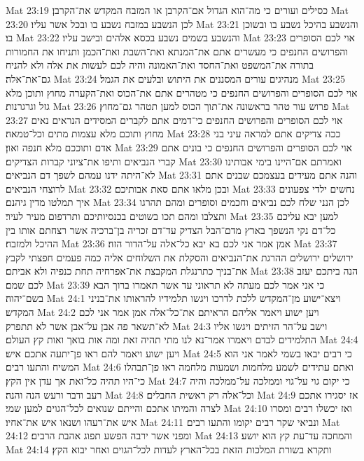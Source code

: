Mat 23:19  כסילים ועורים כי מה־הוא הגדול אם־הקרבן או המזבח המקדש את־הקרבן׃
Mat 23:20  לכן הנשבע במזבח נשבע בו ובכל אשר עליו׃
Mat 23:21  והנשבע בהיכל נשבע בו ובשוכן בו׃
Mat 23:22  והנשבע בשמים נשבע בכסא אלהים ובישב עליו׃
Mat 23:23  אוי לכם הסופרים והפרושים החנפים כי מעשרים אתם את־המנתא ואת־השבת ואת־הכמן ותניחו את החמורות בתורה את־המשפט ואת־החסד ואת־האמונה והיה לכם לעשות את אלה ולא להניח גם־את־אלה׃
Mat 23:24  מנהיגים עורים המסננים את היתוש ובלעים את הגמל׃
Mat 23:25  אוי לכם הסופרים והפרושים החנפים כי מטהרים אתם את־הכוס ואת־הקערה מחוץ ותוכן מלא גזל וגרגרנות׃
Mat 23:26  פרוש עור טהר בראשונה את־תוך הכוס למען תטהר גם־מחוץ׃
Mat 23:27  אוי לכם הסופרים והפרושים החנפים כי־דמים אתם לקברים המסידים הנראים נאים מחוץ ותוכם מלא עצמות מתים וכל־טמאה׃
Mat 23:28  ככה צדיקים אתם למראה עיני בני אדם ותוככם מלא חנפה ואון׃
Mat 23:29  אוי לכם הסופרים והפרושים החנפים כי בונים אתם קברי הנביאים ותיפו את־ציוני קברות הצדיקים׃
Mat 23:30  ואמרתם אם־היינו בימי אבותינו לא־היתה ידנו עמהם לשפך דם הנביאים׃
Mat 23:31  והנה אתם מעידים בעצמכם שבנים אתם לרוצחי הנביאים׃
Mat 23:32  ובכן מלאו אתם סאת אבותיכם׃
Mat 23:33  נחשים ילדי צפעונים איך תמלטו מדין גיהנם׃
Mat 23:34  לכן הנני שלח לכם נביאים וחכמים וסופרים ומהם תהרגו ותצלבו ומהם תכו בשוטים בכנסיותיכם ותרדפום מעיר לעיר׃
Mat 23:35  למען יבא עליכם כל־דם נקי הנשפך בארץ מדם־הבל הצדיק עד־דם זכריה בן־ברכיה אשר רצחתם אותו בין ההיכל ולמזבח׃
Mat 23:36  אמן אמר אני לכם בא יבא כל־אלה על־הדור הזה׃
Mat 23:37  ירושלים ירושלים ההרגת את־הנביאים והסקלת את השלוחים אליה כמה פעמים חפצתי לקבץ את־בניך כתרנגלת המקבצת את־אפרחיה תחת כנפיה ולא אביתם׃
Mat 23:38  הנה ביתכם יעזב לכם שמם׃
Mat 23:39  כי אני אמר לכם מעתה לא תראוני עד אשר תאמרו ברוך הבא בשם־יהוה׃
Mat 24:1  ויצא־ישוע מן־המקדש ללכת לדרכו ויגשו תלמידיו להראותו את־בניני המקדש׃
Mat 24:2  ויען ישוע ויאמר אליהם הראיתם את־כל־אלה אמן אמר אני לכם לא־תשאר פה אבן על־אבן אשר לא תתפרק׃
Mat 24:3  וישב על־הר הזיתים ויגשו אליו התלמידים לבדם ויאמרו אמר־נא לנו מתי תהיה זאת ומה אות בואך ואות קץ העולם׃
Mat 24:4  ויען ישוע ויאמר להם ראו פן־יתעה אתכם איש׃
Mat 24:5  כי רבים יבאו בשמי לאמר אני הוא המשיח והתעו רבים׃
Mat 24:6  ואתם עתידים לשמע מלחמות ושמעות מלחמה ראו פן־תבהלו כי־היו תהיה כל־זאת אך עדן אין הקץ׃
Mat 24:7  כי יקום גוי על־גוי וממלכה על־ממלכה והיה רעב ודבר ורעש הנה והנה׃
Mat 24:8  וכל־אלה רק ראשית החבלים׃
Mat 24:9  אז יסגירו אתכם לצרה והמיתו אתכם והייתם שנואים לכל־הגוים למען שמי׃
Mat 24:10  ואז יכשלו רבים ומסרו איש את־רעהו ושנאו איש את־אחיו׃
Mat 24:11  ונביאי שקר רבים יקומו והתעו רבים׃
Mat 24:12  ומפני אשר ירבה הפשע תפוג אהבת הרבים׃
Mat 24:13  והמחכה עד־עת קץ הוא יושע׃
Mat 24:14  ותקרא בשורת המלכות הזאת בכל־הארץ לעדות לכל־הגוים ואחר יבוא הקץ׃
